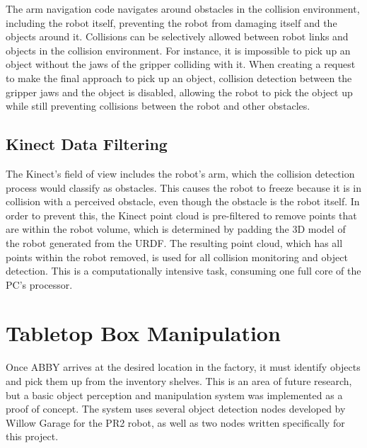 \documentclass[]{cwru} %
\begin{document}
The arm navigation code navigates around obstacles in the collision
environment, including the robot itself, preventing the robot from
damaging itself and the objects around it. Collisions can be selectively
allowed between robot links and objects in the collision environment.
For instance, it is impossible to pick up an object without the jaws of
the gripper colliding with it. When creating a request to make the final
approach to pick up an object, collision detection between the gripper
jaws and the object is disabled, allowing the robot to pick the object
up while still preventing collisions between the robot and other
obstacles.

\subsection{Kinect Data Filtering}

The Kinect's field of view includes the robot's arm, which the collision
detection process would classify as obstacles. This causes the robot to
freeze because it is in collision with a perceived obstacle, even though
the obstacle is the robot itself. In order to prevent this, the Kinect
point cloud is pre-filtered to remove points that are within the robot
volume, which is determined by padding the 3D model of the robot
generated from the URDF. The resulting point cloud, which has all points
within the robot removed, is used for all collision monitoring and
object detection. This is a computationally intensive task, consuming
one full core of the PC's processor.

\section{Tabletop Box Manipulation}
\label{tabletop-manip}

Once ABBY arrives at the desired location in the factory, it must
identify objects and pick them up from the inventory shelves. This is an
area of future research, but a basic object perception and manipulation
system was implemented as a proof of concept. The system uses several
object detection nodes developed by Willow Garage for the PR2 robot, as
well as two nodes written specifically for this project.
\end{document}

